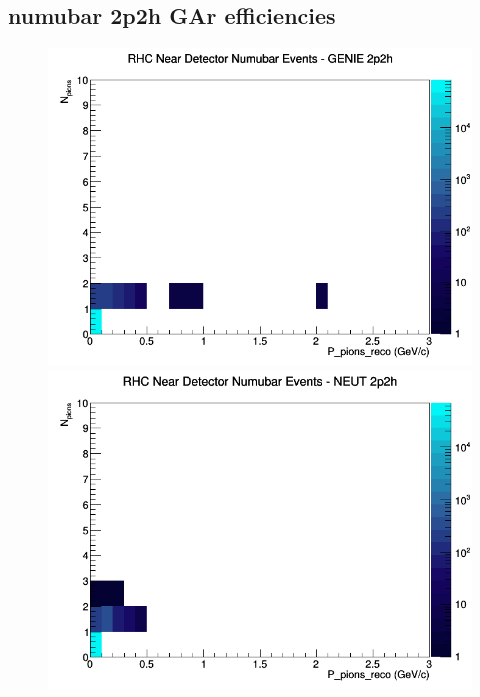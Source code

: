 \documentclass[12pt]{article}
\begin{document}
\subsection{numubar 2p2h GAr efficiencies}
\begin{figure}[h]
\includegraphics[width=\linewidth]{eff_N_P/GAr/pions/2p2h_RHC_ND_numubar_N_P_GENIE.png}
\endminipage
{}
\includegraphics[width=\linewidth]{eff_N_P/GAr/pions/2p2h_RHC_ND_numubar_N_P_NEUT.png}
\endminipage
{}

\end{figure}
\end{document}
